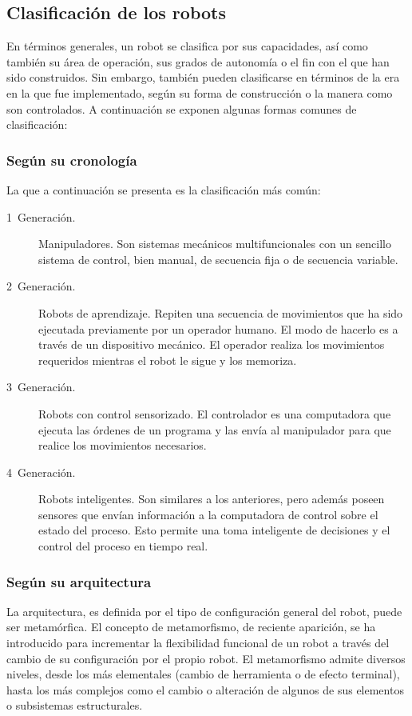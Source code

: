 \subsection{Clasificación de los robots}

En términos generales, un robot se clasifica por sus capacidades, así como también su área de operación, sus grados de autonomía o el fin con el que han sido construidos. Sin embargo, también pueden clasificarse en términos de la era en la que fue implementado, según su forma de construcción o la manera como son controlados. A continuación se exponen algunas formas comunes de clasificación:

\subsubsection{Según su cronología}
La que a continuación se presenta es la clasificación más común:

\begin{description}
\item[1\textordfeminine\ Generación.]
Manipuladores. Son sistemas mecánicos multifuncionales con un sencillo sistema de control, bien manual, de secuencia fija o de secuencia variable.

\item[2\textordfeminine\ Generación.]
Robots de aprendizaje. Repiten una secuencia de movimientos que ha sido ejecutada previamente por un operador humano. El modo de hacerlo es a través de un dispositivo mecánico. El operador realiza los movimientos requeridos mientras el robot le sigue y los memoriza.

\item[3\textordfeminine\ Generación.]
Robots con control sensorizado. El controlador es una computadora que ejecuta las órdenes de un programa y las envía al manipulador para que realice los movimientos necesarios.

\item[4\textordfeminine\ Generación.]
Robots inteligentes. Son similares a los anteriores, pero además poseen sensores que envían información a la computadora de control sobre el estado del proceso. Esto permite una toma inteligente de decisiones y el control del proceso en tiempo real.
\end{description}

\subsubsection{Según su arquitectura}
La arquitectura, es definida por el tipo de configuración general del robot, puede ser metamórfica. El concepto de metamorfismo, de reciente aparición, se ha introducido para incrementar la flexibilidad funcional de un robot a través del cambio de su configuración por el propio robot.
El metamorfismo admite diversos niveles, desde los más elementales (cambio de herramienta o de efecto terminal), hasta los más complejos como el cambio o alteración de algunos de sus elementos o subsistemas estructurales.

